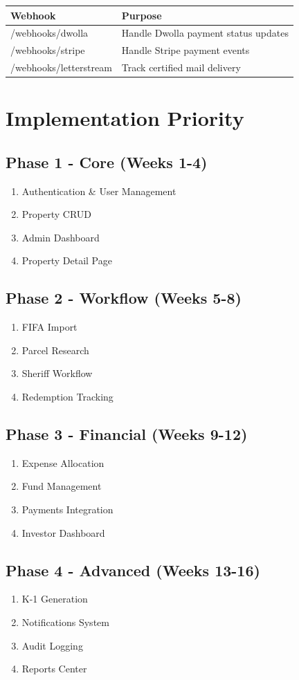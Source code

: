 \documentclass[11pt,a4paper]{article}
\begin{document}
\begin{longtable}{|p{4cm}|p{9cm}|}
\hline
\textbf{Webhook} & \textbf{Purpose} \\
\hline
/webhooks/dwolla & Handle Dwolla payment status updates \\
/webhooks/stripe & Handle Stripe payment events \\
/webhooks/letterstream & Track certified mail delivery \\
\hline
\end{longtable}

\section{Implementation Priority}

\subsection{Phase 1 - Core (Weeks 1-4)}
\begin{enumerate}
    \item Authentication \& User Management
    \item Property CRUD
    \item Admin Dashboard
    \item Property Detail Page
\end{enumerate}

\subsection{Phase 2 - Workflow (Weeks 5-8)}
\begin{enumerate}
    \item FIFA Import
    \item Parcel Research
    \item Sheriff Workflow
    \item Redemption Tracking
\end{enumerate}

\subsection{Phase 3 - Financial (Weeks 9-12)}
\begin{enumerate}
    \item Expense Allocation
    \item Fund Management
    \item Payments Integration
    \item Investor Dashboard
\end{enumerate}

\subsection{Phase 4 - Advanced (Weeks 13-16)}
\begin{enumerate}
    \item K-1 Generation
    \item Notifications System
    \item Audit Logging
    \item Reports Center
\end{enumerate}
\end{document}
